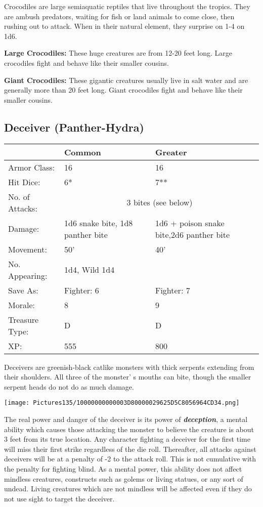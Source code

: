 \documentclass[a4paper,twoside,openany,10pt]{book}
\begin{document}
\begin{multicols}{2}
Crocodiles are large semiaquatic reptiles that live throughout the tropics. They are ambush predators, waiting for fish or land animals to come close, then rushing out to attack. When in their natural element, they surprise on 1-4 on 1d6.

\textbf{Large Crocodiles:} These huge creatures are from 12-20 feet long. Large crocodiles fight and behave like their smaller cousins.

\textbf{Giant Crocodiles:} These gigantic creatures usually live in salt water and are generally more than 20 feet long. Giant crocodiles fight and behave like their smaller cousins.

\subsection*{Deceiver (Panther-Hydra)}\label{deceiver-panther-hydra}

\begin{tabularx}{0.48\textwidth}{lXX}
& Common & Greater \\\hline
Armor Class: & 16 & 16 \\\hline
Hit Dice: & 6* & 7** \\\hline
No. of Attacks: &\multicolumn{2}{c}{3 bites (see below)} \\\hline
Damage: & 1d6 snake bite, 1d8 panther bite & 1d6 + poison snake bite,2d6 panther bite \\\hline
Movement: & 50' & 40' \\\hline
No. Appearing: & 1d4, Wild 1d4 & \\\hline
Save As: & Fighter: 6 & Fighter: 7 \\\hline
Morale: & 8 & 9 \\\hline
Treasure Type: & D & D \\\hline
XP: & 555 & 800 \\\hline
\end{tabularx}\medskip

Deceivers are greenish-black catlike monsters with thick serpents extending from their shoulders. All three of the monster' s mouths can bite, though the smaller serpent heads do not do as much damage.


\begin{center}
	\texttt{[image: Pictures135/10000000000003D80000029625D5C8056964CD34.png]}
\end{center}

The real power and danger of the deceiver is its power of \emph{\textbf{deception}}, a mental ability which causes those attacking the monster to believe the creature is about 3 feet from its true location. Any character fighting a deceiver for the first time will miss their first strike regardless of the die roll. Thereafter, all attacks against deceivers will be at a penalty of -2 to the attack roll. This is not cumulative with the penalty for fighting blind. As a mental power, this ability does not affect mindless creatures, constructs such as golems or living statues, or any sort of undead. Living creatures which are not mindless will be affected even if they do not use sight to target the deceiver.


\end{multicols}
\end{document}
